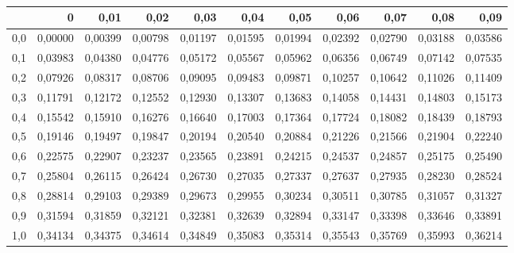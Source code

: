 \documentclass[14pt,aspectratio=1610]{beamer}
\begin{document}
\begin{frame}[fragile]{}
\frametitle{}
\begin{block}{}
\begin{center}
\end{center}
\end{block}
\end{frame}

\begin{frame}[fragile]{}
\frametitle{}
\begin{block}{}
\begin{center}
\small\addtolength{\tabcolsep}{-3pt}
{\footnotesize
\begin{tabular}{rrrrrrrrrrr}
  \hline
 & 0 & 0,01 & 0,02 & 0,03 & 0,04 & 0,05 & 0,06 & 0,07 & 0,08 & 0,09 \\ 
  \hline
0,0 & 0,00000 & 0,00399 & 0,00798 & 0,01197 & 0,01595 & 0,01994 & 0,02392 & 0,02790 & 0,03188 & 0,03586 \\ 
  0,1 & 0,03983 & 0,04380 & 0,04776 & 0,05172 & 0,05567 & 0,05962 & 0,06356 & 0,06749 & 0,07142 & 0,07535 \\ 
  0,2 & 0,07926 & 0,08317 & 0,08706 & 0,09095 & 0,09483 & 0,09871 & 0,10257 & 0,10642 & 0,11026 & 0,11409 \\ 
  0,3 & 0,11791 & 0,12172 & 0,12552 & 0,12930 & 0,13307 & 0,13683 & 0,14058 & 0,14431 & 0,14803 & 0,15173 \\ 
  0,4 & 0,15542 & 0,15910 & 0,16276 & 0,16640 & 0,17003 & 0,17364 & 0,17724 & 0,18082 & 0,18439 & 0,18793 \\ 
  0,5 & 0,19146 & 0,19497 & 0,19847 & 0,20194 & 0,20540 & 0,20884 & 0,21226 & 0,21566 & 0,21904 & 0,22240 \\ 
  0,6 & 0,22575 & 0,22907 & 0,23237 & 0,23565 & 0,23891 & 0,24215 & 0,24537 & 0,24857 & 0,25175 & 0,25490 \\ 
  0,7 & 0,25804 & 0,26115 & 0,26424 & 0,26730 & 0,27035 & 0,27337 & 0,27637 & 0,27935 & 0,28230 & 0,28524 \\ 
  0,8 & 0,28814 & 0,29103 & 0,29389 & 0,29673 & 0,29955 & 0,30234 & 0,30511 & 0,30785 & 0,31057 & 0,31327 \\ 
  0,9 & 0,31594 & 0,31859 & 0,32121 & 0,32381 & 0,32639 & 0,32894 & 0,33147 & 0,33398 & 0,33646 & 0,33891 \\ 
  1,0 & 0,34134 & 0,34375 & 0,34614 & 0,34849 & 0,35083 & 0,35314 & 0,35543 & 0,35769 & 0,35993 & 0,36214 \\ 

\end{tabular}}
\end{center}
\end{block}
\end{frame}
\end{document}
